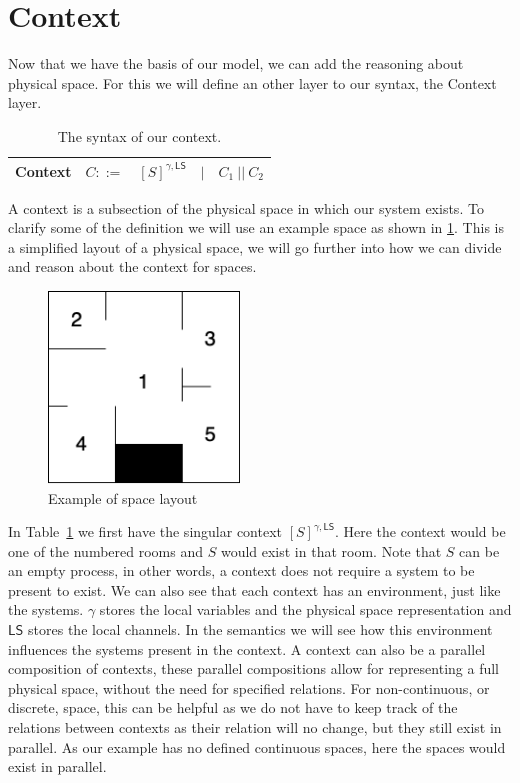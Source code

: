 \section{Context}
Now that we have the basis of our model, we can add the reasoning about physical space. For this we will define an other layer to our syntax, the Context layer.\\
\begin{table}[H]
\centering
\begin{tabular}{|l l l|}
 \hline
 Context & $C ::=$ & $  [S]^{\gamma , \mathsf{LS}}\quad |\quad C_1 \ || \ C_2$\\
 \hline
\end{tabular}
\caption{The syntax of our context.}
\label{cont}
\end{table}
A context is a subsection of the physical space in which our system exists. To clarify some of the definition we will use an example space as shown in \ref{fig:examplespace}. This is a simplified layout of a physical space, we will go further into how we can divide and reason about the context for spaces.
\begin{figure}[H] 
		 \centering
		 \includegraphics[width=2in]{figure/Map.drawio.png} 
		 \caption{Example of space layout} 
		 \label{fig:examplespace} 
\end{figure}
In Table~\ref{cont} we first have the singular context $[S]^{\gamma , \mathsf{LS}}$. Here the context would be one of the numbered rooms and $S$ would exist in that room. Note that $S$ can be an empty process, in other words, a context does not require a system to be present to exist. We can also see that each context has an environment, just like the systems. $\gamma$ stores the local variables and the physical space representation and $\mathsf{LS}$ stores the local channels. In the semantics we will see how this environment influences the systems present in the context. A context can also be a parallel composition of contexts, these parallel compositions allow for representing a full physical space, without the need for specified relations. For non-continuous, or discrete, space, this can be helpful as we do not have to keep track of the relations between contexts as their relation will no change, but they still exist in parallel. As our example has no defined continuous spaces, here the spaces would exist in parallel.
